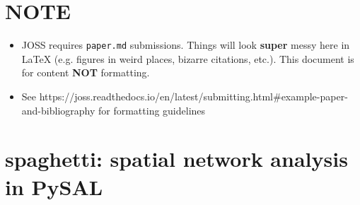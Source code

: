 \documentclass{article}
\begin{document}
\section{NOTE}
\begin{itemize}
\item JOSS requires \texttt{paper.md} submissions. Things will look \textbf{super} messy here in \LaTeX{} (e.g. figures in weird places, bizarre citations, etc.). This document is for content \textbf{NOT} formatting. 
\item See https://joss.readthedocs.io/en/latest/submitting.html\#example-paper-and-bibliography for formatting guidelines
\end{itemize}

\section{spaghetti: spatial network analysis in PySAL}
\end{document}
